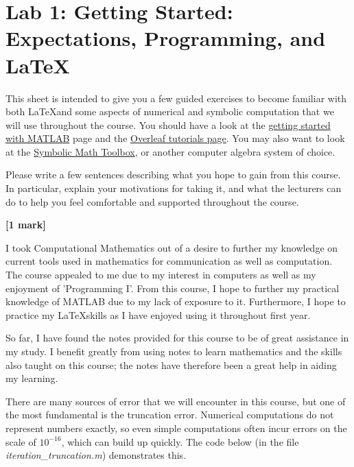 \documentclass[11pt]{article}
\begin{document}
\section*{Lab 1: Getting Started: Expectations, Programming, and \LaTeX}

\setcounter{section}{0}  %

This sheet is intended to give you a few guided exercises to become familiar with both \LaTeX and some aspects of numerical and symbolic computation that we will use throughout the course. You should have a look at the \href{https://uk.mathworks.com/help/matlab/getting-started-with-matlab.html}{getting started with MATLAB} page and the \href{https://www.overleaf.com/learn/latex/Tutorials}{Overleaf tutorials page}. You may also want to look at the \href{https://uk.mathworks.com/products/symbolic.html}{Symbolic Math Toolbox}, or another computer algebra system of choice.


Please write a few sentences describing what you hope to gain from this course.  In particular, explain your motivations for taking it, and what the lecturers can do to help you feel comfortable and supported throughout the course.

\hfill \textbf{[1 mark]}

\work

I took Computational Mathematics out of a desire to further my knowledge on current tools used in mathematics for communication as well as computation. The course appealed to me due to my interest in computers as well as my enjoyment of 'Programming I'. From this course, I hope to further my practical knowledge of MATLAB due to my lack of exposure to it. Furthermore, I hope to practice my \LaTeX  skills as I have enjoyed using it throughout first year. 

\noindent So far, I have found the notes provided for this course to be of great assistance in my study. I benefit greatly from using notes to learn mathematics and the skills also taught on this course; the notes have therefore been a great help in aiding my learning. 


There are many sources of error that we will encounter in this course, but one of the most fundamental is the truncation error. Numerical computations do not represent numbers exactly, so even simple computations often incur errors on the scale of $10^{-16}$, which can build up quickly. The code below (in the file \textit{iteration\_truncation.m}) demonstrates this. 
\end{document}
